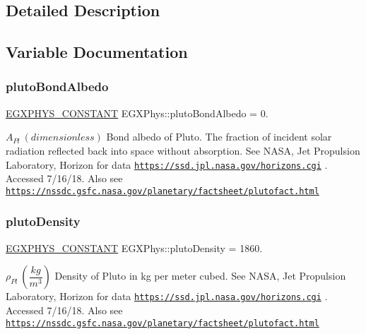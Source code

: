 \subsection{Detailed Description}


\subsection{Variable Documentation}
\mbox{\label{group___e_g_x_phys-_constants-_astrophysics-_solar_system-_pluto-_bulk_gab0bb375e06a6bae85b474d6629f87f57}} 
\subsubsection{\texorpdfstring{pluto\+Bond\+Albedo}{plutoBondAlbedo}}
{\footnotesize\ttfamily \mbox{\hyperlink{group___e_g_x_phys-_constants-_macros_ga76980d288494ce1714c9ac68a95ba702}{E\+G\+X\+P\+H\+Y\+S\+\_\+\+C\+O\+N\+S\+T\+A\+NT}} E\+G\+X\+Phys\+::pluto\+Bond\+Albedo = 0.}

$ A_{Pl} \ (dimensionless)$ Bond albedo of Pluto. The fraction of incident solar radiation reflected back into space without absorption. See N\+A\+SA, Jet Propulsion Laboratory, Horizon for data \href{https://ssd.jpl.nasa.gov/horizons.cgi}{\tt https\+://ssd.\+jpl.\+nasa.\+gov/horizons.\+cgi} . Accessed 7/16/18. Also see \href{https://nssdc.gsfc.nasa.gov/planetary/factsheet/plutofact.html}{\tt https\+://nssdc.\+gsfc.\+nasa.\+gov/planetary/factsheet/plutofact.\+html} \mbox{\label{group___e_g_x_phys-_constants-_astrophysics-_solar_system-_pluto-_bulk_ga299c62200c1c928f7826dfad0bb401b8}} 
\subsubsection{\texorpdfstring{pluto\+Density}{plutoDensity}}
{\footnotesize\ttfamily \mbox{\hyperlink{group___e_g_x_phys-_constants-_macros_ga76980d288494ce1714c9ac68a95ba702}{E\+G\+X\+P\+H\+Y\+S\+\_\+\+C\+O\+N\+S\+T\+A\+NT}} E\+G\+X\+Phys\+::pluto\+Density = 1860.}

$\rho_{Pl} \ (\dfrac{kg}{m^3})$ Density of Pluto in kg per meter cubed. See N\+A\+SA, Jet Propulsion Laboratory, Horizon for data \href{https://ssd.jpl.nasa.gov/horizons.cgi}{\tt https\+://ssd.\+jpl.\+nasa.\+gov/horizons.\+cgi} . Accessed 7/16/18. Also see \href{https://nssdc.gsfc.nasa.gov/planetary/factsheet/plutofact.html}{\tt https\+://nssdc.\+gsfc.\+nasa.\+gov/planetary/factsheet/plutofact.\+html} \mbox{\label{group___e_g_x_phys-_constants-_astrophysics-_solar_system-_pluto-_bulk_gae2455ed57bcf053b7b3e8b057d190604}} 
